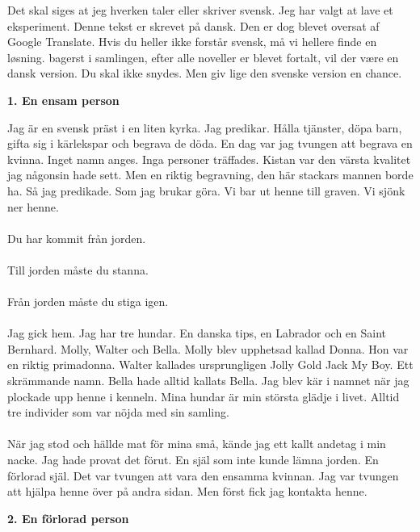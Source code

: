\documentclass[]{article}
\begin{document}
Det skal siges at jeg hverken taler eller skriver svensk. Jeg har valgt at lave et eksperiment. Denne tekst er skrevet på dansk. Den er dog blevet oversat af Google Translate. Hvis du heller ikke forstår svensk, må vi hellere finde en løsning. bagerst i samlingen, efter alle noveller er blevet fortalt, vil der være en dansk version. Du skal ikke snydes. Men giv lige den svenske version en chance.

\begin{center}
	\large\textbf{1. En ensam person}
\end{center}

Jag är en svensk präst i en liten kyrka. Jag predikar. Hålla tjänster, döpa barn, gifta sig i kärlekspar och begrava de döda. En dag var jag tvungen att begrava en kvinna. Inget namn anges. Inga personer träffades. Kistan var den värsta kvalitet jag någonsin hade sett. Men en riktig begravning, den här stackars mannen borde ha. Så jag predikade. Som jag brukar göra. Vi bar ut henne till graven. Vi sjönk ner henne.
\\ \\
Du har kommit från jorden.
\\ \\
Till jorden måste du stanna.
\\ \\
Från jorden måste du stiga igen.
\\ \\
Jag gick hem. Jag har tre hundar. En danska tips, en Labrador och en Saint Bernhard. Molly, Walter och Bella. Molly blev upphetsad kallad Donna. Hon var en riktig primadonna. Walter kallades ursprungligen Jolly Gold Jack My Boy. Ett skrämmande namn. Bella hade alltid kallats Bella. Jag blev kär i namnet när jag plockade upp henne i kenneln. Mina hundar är min största glädje i livet. Alltid tre individer som var nöjda med sin samling.
\\ \\
När jag stod och hällde mat för mina små, kände jag ett kallt andetag i min nacke. Jag hade provat det förut. En själ som inte kunde lämna jorden. En förlorad själ. Det var tvungen att vara den ensamma kvinnan. Jag var tvungen att hjälpa henne över på andra sidan. Men först fick jag kontakta henne.

\begin{center}
	\large\textbf{2. En förlorad person}
\end{center}
\end{document}
